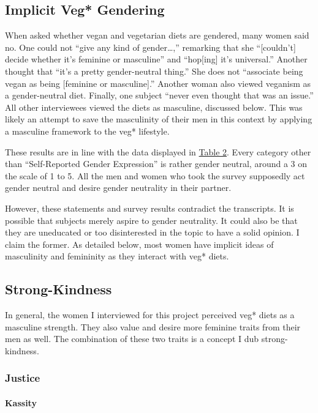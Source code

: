 \documentclass[twoside]{report}
\begin{document}
\subsection{Implicit Veg* Gendering}

When asked whether vegan and vegetarian diets are gendered, many women said no. One could not ``give any kind of gender\ldots,'' remarking that she ``{[}couldn't{]} decide whether it's feminine or masculine'' and ``hop{[}ing{]} it's universal.'' Another thought that ``it's a pretty gender-neutral thing.'' She does not ``associate being vegan as being {[}feminine or masculine{]}.'' Another woman also viewed veganism as a gender-neutral diet. Finally, one subject ``never even thought that was an issue.'' All other interviewees viewed the diets as masculine, discussed below. This was likely an attempt to save the masculinity of their men in this context by applying a masculine framework to the veg* lifestyle.

These results are in line with the data displayed in \hyperlink{table-2}{Table 2}. Every category other than ``Self-Reported Gender Expression'' is rather gender neutral, around a 3 on the scale of 1 to 5. All the men and women who took the survey supposedly act gender neutral and desire gender neutrality in their partner.

However, these statements and survey results contradict the transcripts. It is possible that subjects merely aspire to gender neutrality. It could also be that they are uneducated or too disinterested in the topic to have a solid opinion. I claim the former. As detailed below, most women have implicit ideas of masculinity and femininity as they interact with veg* diets.

\subsection{Strong-Kindness}

In general, the women I interviewed for this project perceived veg* diets as a masculine strength. They also value and desire more feminine traits from their men as well. The combination of these two traits is a concept I dub strong-kindness.

\subsubsection{Justice}

\paragraph{Kassity}
\end{document}
